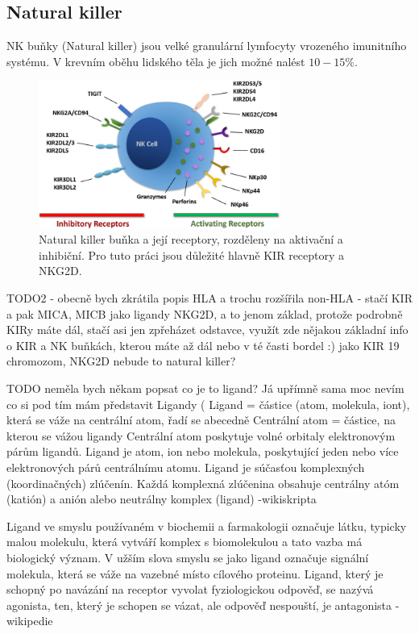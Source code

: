 \documentclass[czech,DP]{thesiskiv}
\begin{document}
\subsection{Natural killer}
NK buňky (Natural killer) jsou velké granulární lymfocyty vrozeného imunitního systému. V krevním oběhu lidského těla je jich možné nalést $10-15\%$.  

\begin{figure}[H]		
		\centering
		\includegraphics[width=300px]{./img/nk_receptory.jpg}
		\caption{Natural killer buňka a její receptory, rozděleny na aktivační a inhibiční. Pro tuto práci jsou důležité hlavně KIR receptory a NKG2D. \cite{NK_receptors} }
		\label{fig:hla_genome}
\end{figure}

TODO2 - obecně bych zkrátila popis HLA a trochu rozšířila non-HLA - stačí KIR a pak MICA, MICB jako ligandy NKG2D, a to jenom základ, protože podrobně KIRy máte dál, stačí asi jen zpřeházet odstavce, využít zde nějakou základní info o KIR a NK buňkách, kterou máte až dál nebo v té časti bordel :) jako KIR 19 chromozom, 
NKG2D nebude to natural killer?



TODO neměla bych někam popsat co je to ligand? Já upřímně sama moc nevím co si pod tím mám představit
Ligandy (%
Ligand = částice (atom, molekula, iont), která se váže na centrální atom, řadí se abecedně
Centrální atom = částice, na kterou se vážou ligandy
Centrální atom poskytuje volné orbitaly elektronovým párům ligandů.
Ligand je atom, ion nebo molekula, poskytující jeden nebo více elektronových párů centrálnímu atomu. Ligand je súčasťou komplexných (koordinačných) zlúčenín. Každá komplexná zlúčenina obsahuje centrálny atóm (katión) a anión alebo neutrálny komplex (ligand)
-wikiskripta

Ligand ve smyslu používaném v biochemii a farmakologii označuje látku, typicky malou molekulu, která vytváří komplex s biomolekulou a tato vazba má biologický význam. V užším slova smyslu se jako ligand označuje signální molekula, která se váže na vazebné místo cílového proteinu. Ligand, který je schopný po navázání na receptor vyvolat fyziologickou odpověď, se nazývá agonista, ten, který je schopen se vázat, ale odpověď nespouští, je antagonista
- wikipedie
\end{document}
